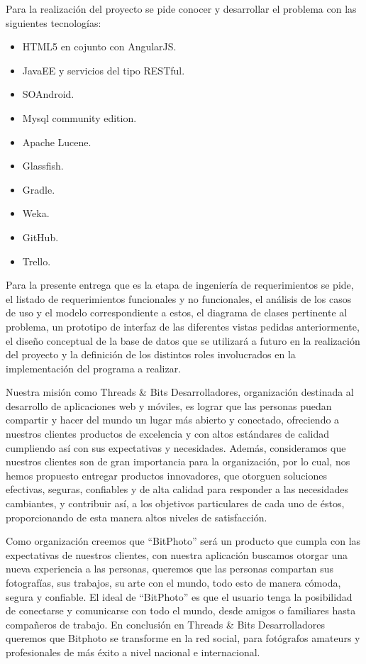 \documentclass{memoria}
\begin{document}
Para la realización del proyecto se pide conocer y desarrollar el problema con las siguientes tecnologías:

\begin{itemize}
    \item HTML5 en cojunto con AngularJS.
    \item JavaEE y servicios del tipo RESTful.
    \item SOAndroid.
    \item Mysql community edition.
    \item Apache Lucene.
    \item Glassfish.
    \item Gradle.
    \item Weka.
    \item GitHub.
    \item Trello.
\end{itemize}

Para la presente entrega que es la etapa de ingeniería de requerimientos se pide, el listado de requerimientos funcionales y no funcionales, el análisis de los casos de uso y el modelo correspondiente a estos, el diagrama de clases pertinente al problema, un prototipo de interfaz de las diferentes vistas pedidas anteriormente, el diseño conceptual de la base de datos que se utilizará a futuro en la realización del proyecto y la definición de los distintos roles involucrados en la implementación del programa a realizar.




Nuestra misión como Threads \& Bits Desarrolladores, organización destinada al desarrollo de aplicaciones web y móviles, es  lograr que las personas puedan compartir y hacer del mundo un lugar más abierto y conectado, ofreciendo a nuestros clientes productos de excelencia y con altos estándares de calidad cumpliendo así con sus expectativas y necesidades. Además, consideramos que nuestros clientes son de gran importancia para la organización, por lo cual, nos hemos propuesto entregar productos innovadores, que otorguen soluciones efectivas, seguras, confiables y de alta calidad para responder a las necesidades cambiantes, y contribuir así, a los objetivos particulares de cada uno de éstos, proporcionando de esta manera altos niveles de satisfacción.

Como organización creemos que “BitPhoto” será un producto que cumpla con las expectativas de nuestros clientes, con nuestra aplicación buscamos otorgar una nueva experiencia a las personas, queremos que las personas compartan sus fotografías, sus trabajos, su arte con el mundo, todo esto de manera cómoda, segura y confiable. El ideal de “BitPhoto” es que el usuario tenga la posibilidad de conectarse y comunicarse con todo el mundo, desde amigos o familiares hasta compañeros de trabajo. En conclusión en Threads \& Bits Desarrolladores queremos que Bitphoto se transforme en la red social, para fotógrafos amateurs y profesionales de más éxito a nivel nacional e internacional.
\end{document}

